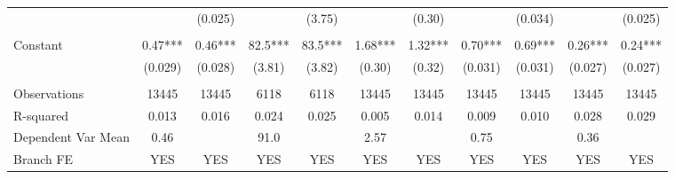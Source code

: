 \begin{tabular}{rrrrrrrrrrr}
      & \multicolumn{1}{c}{} & \multicolumn{1}{c}{\cellcolor[rgb]{ .816,  .808,  .808} (0.025)} & \multicolumn{1}{c}{} & \multicolumn{1}{c}{\cellcolor[rgb]{ .816,  .808,  .808} (3.75)} & \multicolumn{1}{c}{} & \multicolumn{1}{c}{\cellcolor[rgb]{ .816,  .808,  .808} (0.30)} & \multicolumn{1}{c}{} & \multicolumn{1}{c}{\cellcolor[rgb]{ .816,  .808,  .808} (0.034)} & \multicolumn{1}{c}{} & \multicolumn{1}{c}{\cellcolor[rgb]{ .816,  .808,  .808} (0.025)} \\
      &       &       &       &       &       &       &       &       &       &  \\
\multicolumn{1}{l}{Constant} & \multicolumn{1}{c}{0.47***} & \multicolumn{1}{c}{0.46***} & \multicolumn{1}{c}{82.5***} & \multicolumn{1}{c}{83.5***} & \multicolumn{1}{c}{1.68***} & \multicolumn{1}{c}{1.32***} & \multicolumn{1}{c}{0.70***} & \multicolumn{1}{c}{0.69***} & \multicolumn{1}{c}{0.26***} & \multicolumn{1}{c}{0.24***} \\
\multicolumn{1}{l}{} & \multicolumn{1}{c}{(0.029)} & \multicolumn{1}{c}{(0.028)} & \multicolumn{1}{c}{(3.81)} & \multicolumn{1}{c}{(3.82)} & \multicolumn{1}{c}{(0.30)} & \multicolumn{1}{c}{(0.32)} & \multicolumn{1}{c}{(0.031)} & \multicolumn{1}{c}{(0.031)} & \multicolumn{1}{c}{(0.027)} & \multicolumn{1}{c}{(0.027)} \\
      &       &       &       &       &       &       &       &       &       &  \\
\midrule
\multicolumn{1}{l}{Observations} & \multicolumn{1}{c}{13445} & \multicolumn{1}{c}{13445} & \multicolumn{1}{c}{6118} & \multicolumn{1}{c}{6118} & \multicolumn{1}{c}{13445} & \multicolumn{1}{c}{13445} & \multicolumn{1}{c}{13445} & \multicolumn{1}{c}{13445} & \multicolumn{1}{c}{13445} & \multicolumn{1}{c}{13445} \\
\multicolumn{1}{l}{R-squared} & \multicolumn{1}{c}{0.013} & \multicolumn{1}{c}{0.016} & \multicolumn{1}{c}{0.024} & \multicolumn{1}{c}{0.025} & \multicolumn{1}{c}{0.005} & \multicolumn{1}{c}{0.014} & \multicolumn{1}{c}{0.009} & \multicolumn{1}{c}{0.010} & \multicolumn{1}{c}{0.028} & \multicolumn{1}{c}{0.029} \\
\multicolumn{1}{l}{Dependent Var Mean} & \multicolumn{1}{c}{0.46} & \multicolumn{1}{c}{} & \multicolumn{1}{c}{91.0} & \multicolumn{1}{c}{} & \multicolumn{1}{c}{2.57} & \multicolumn{1}{c}{} & \multicolumn{1}{c}{0.75} & \multicolumn{1}{c}{} & \multicolumn{1}{c}{0.36} & \multicolumn{1}{c}{} \\
\multicolumn{1}{l}{Branch FE} & \multicolumn{1}{c}{YES} & \multicolumn{1}{c}{YES} & \multicolumn{1}{c}{YES} & \multicolumn{1}{c}{YES} & \multicolumn{1}{c}{YES} & \multicolumn{1}{c}{YES} & \multicolumn{1}{c}{YES} & \multicolumn{1}{c}{YES} & \multicolumn{1}{c}{YES} & \multicolumn{1}{c}{YES} \\

\end{tabular}
